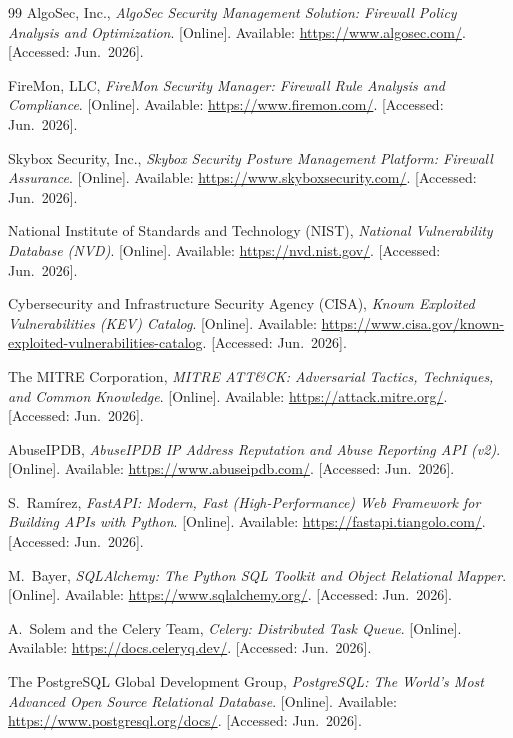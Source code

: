\documentclass[12pt,a4paper]{report}
\renewcommand{\_}{\textunderscore\allowbreak}
\begin{document}
\begin{thebibliography}{99}
AlgoSec, Inc., \emph{AlgoSec Security Management Solution: Firewall Policy Analysis and Optimization}. [Online]. Available: \url{https://www.algosec.com/}. [Accessed: Jun.~2026].

FireMon, LLC, \emph{FireMon Security Manager: Firewall Rule Analysis and Compliance}. [Online]. Available: \url{https://www.firemon.com/}. [Accessed: Jun.~2026].

Skybox Security, Inc., \emph{Skybox Security Posture Management Platform: Firewall Assurance}. [Online]. Available: \url{https://www.skyboxsecurity.com/}. [Accessed: Jun.~2026].

National Institute of Standards and Technology (NIST), \emph{National Vulnerability Database (NVD)}. [Online]. Available: \url{https://nvd.nist.gov/}. [Accessed: Jun.~2026].

Cybersecurity and Infrastructure Security Agency (CISA), \emph{Known Exploited Vulnerabilities (KEV) Catalog}. [Online]. Available: \url{https://www.cisa.gov/known-exploited-vulnerabilities-catalog}. [Accessed: Jun.~2026].

The MITRE Corporation, \emph{MITRE ATT\&CK: Adversarial Tactics, Techniques, and Common Knowledge}. [Online]. Available: \url{https://attack.mitre.org/}. [Accessed: Jun.~2026].

AbuseIPDB, \emph{AbuseIPDB IP Address Reputation and Abuse Reporting API (v2)}. [Online]. Available: \url{https://www.abuseipdb.com/}. [Accessed: Jun.~2026].

S.~Ram\'irez, \emph{FastAPI: Modern, Fast (High-Performance) Web Framework for Building APIs with Python}. [Online]. Available: \url{https://fastapi.tiangolo.com/}. [Accessed: Jun.~2026].

M.~Bayer, \emph{SQLAlchemy: The Python SQL Toolkit and Object Relational Mapper}. [Online]. Available: \url{https://www.sqlalchemy.org/}. [Accessed: Jun.~2026].

A.~Solem and the Celery Team, \emph{Celery: Distributed Task Queue}. [Online]. Available: \url{https://docs.celeryq.dev/}. [Accessed: Jun.~2026].

The PostgreSQL Global Development Group, \emph{PostgreSQL: The World's Most Advanced Open Source Relational Database}. [Online]. Available: \url{https://www.postgresql.org/docs/}. [Accessed: Jun.~2026].


\end{thebibliography}
\end{document}
